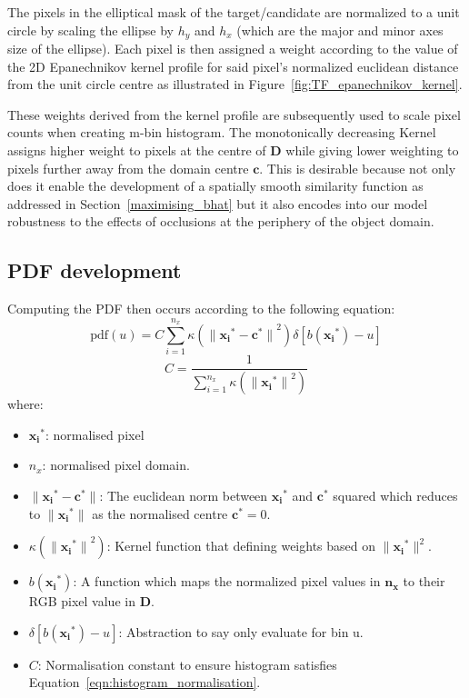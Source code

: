 
The pixels in the elliptical mask of the target/candidate are normalized to a unit
circle by scaling the ellipse by $h_y$ and $h_x$ (which are the major and minor
axes size of the ellipse). Each pixel is then assigned a weight according to the
value of the 2D Epanechnikov kernel profile for said pixel's normalized euclidean
distance from the unit circle centre as illustrated in Figure~\ref{fig:TF_epanechnikov_kernel}.

These weights derived from the kernel profile are subsequently used to scale
pixel counts when creating m-bin histogram. The monotonically decreasing Kernel
assigns higher weight to pixels at the centre of $\mathbf{D}$ while giving lower
weighting to pixels further away from the domain centre $\mathbf{c}$. 
This is desirable because not only does it enable the development of a spatially
smooth similarity function as addressed in Section~\ref{maximising_bhat} but it
also encodes into our model robustness to the effects of occlusions at the
periphery of the object domain.

\subsection{PDF development}
Computing the PDF then occurs according to the following equation:
\begin{equation}\label{eqn:mean_shift_histogram}
    \text{pdf}(u)=C\sum_{i=1}^{n_x}\kappa({\parallel{\mathbf{x_i}^*}-{\mathbf{c}^*}\parallel}^2)\delta[b(\mathbf{x_i}^*)-u]    
\end{equation}
\begin{equation}\label{eqn:histogram_normalisation}
    C=\frac{1}{\sum_{i=1}^{n_x}\kappa({\parallel\mathbf{x_i}^*\parallel}^2)}
\end{equation}
where:
\begin{itemize}
    \item $\mathbf{x_i}^*$: normalised pixel 
    \item $n_x$: normalised pixel domain.
    \item $\parallel{\mathbf{x_i}}^*-{\mathbf{c}}^*\parallel$: The euclidean
        norm between $\mathbf{x_i}^*$ and ${\mathbf{c}}^*$ squared which
        reduces to $\parallel{\mathbf{x_i}}^*\parallel$ as the normalised centre
        $\mathbf{c}^* = 0$. 
    \item $\kappa({\parallel{\mathbf{x_i}}^*\parallel}^2)$: Kernel function that
        defining weights based on $\parallel{\mathbf{x_i}}^*\parallel^2$.
    \item $b({\mathbf{x_i}}^*)$: A function which maps the normalized pixel
        values in $\mathbf{n_x}$ to their RGB pixel value in $\mathbf{D}$.
    \item $\delta[b({\mathbf{x_i}}^*)-u]$: Abstraction to say only evaluate for bin u.
    \item $C$: Normalisation constant to ensure histogram satisfies Equation~\ref{eqn:histogram_normalisation}.
\end{itemize}

